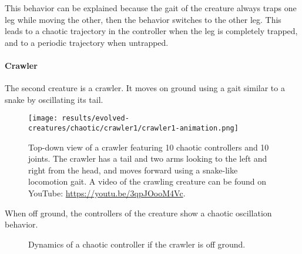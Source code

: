 \documentclass[main]{subfiles}
\begin{document}
This behavior can be explained because the gait of the creature always traps one leg while moving the other, then the behavior switches to the other leg. %
%
This leads to a chaotic trajectory in the controller when the leg is completely trapped, and to a periodic trajectory when untrapped. %

\paragraph{Crawler}

The second creature is a crawler. It moves on ground using a gait similar to a snake by oscillating its tail.

\begin{figure}[H]
\centering
\texttt{[image: results/evolved-creatures/chaotic/crawler1/crawler1-animation.png]}
\caption[Figure of a crawler using chaotic controllers.]{Top-down view of a crawler featuring 10 chaotic controllers and 10 joints. The crawler has a tail and two arms looking to the left and right from the head, and moves forward using a snake-like locomotion gait. A video of the crawling creature can be found on YouTube: \url{https://youtu.be/3qpJOooM4Vc}.}
\label{figure:successfulcreatures-chaotic-crawler1}
\end{figure}

When off ground, the controllers of the creature show a chaotic oscillation behavior. %

\begin{figure}[H]
\centering
	\begin{minipage}{1.3\textwidth}
	\hspace*{-5em}
	\end{minipage}
\caption[Off ground controller dynamics of the crawler]{Dynamics of a chaotic controller if the crawler is off ground.}
\label{figure:crawler1-off-ground-controller-dynamics}
\end{figure}
\end{document}
